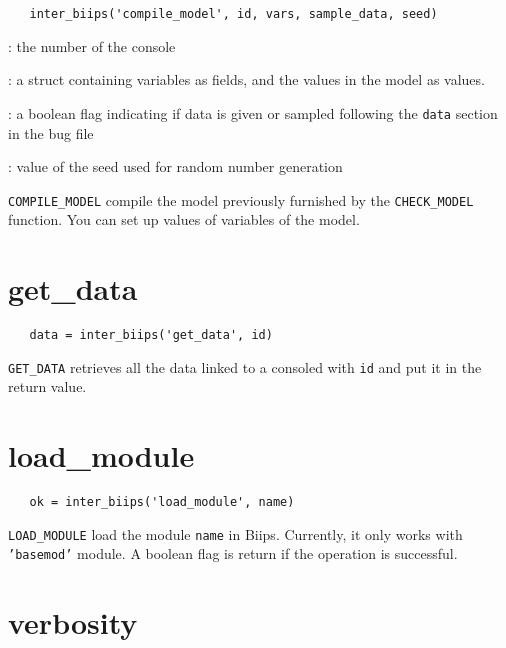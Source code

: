 \documentclass[11pt]{article}
\begin{document}
 \begin{lstlisting}
   inter_biips('compile_model', id, vars, sample_data, seed) 
 \end{lstlisting}
   \begin{description}
   \setlength{\baselineskip}{0.1\baselineskip}
     \item[\texttt{id}]: the number of the console
     \item[\texttt{vars}]: a struct containing variables as fields, and the values in the model as values.
     \item[\texttt{sample\_data}]: a boolean flag indicating if data is given or sampled following the \texttt{data} section in the bug file
     \item[\texttt{seed}]: value of the seed used for random number generation
   
   \end{description}

   \texttt{COMPILE\_MODEL} compile the model previously furnished by the \texttt{CHECK\_MODEL} function. You can set up values of variables of 
   the model.


\section{get\_data}
   
 \begin{lstlisting}
   data = inter_biips('get_data', id) 
 \end{lstlisting}
 
  \texttt{GET\_DATA} retrieves all the data linked to a consoled with \texttt{id} and put it in the return value.


\section{load\_module}
 
 \begin{lstlisting}
   ok = inter_biips('load_module', name)
 \end{lstlisting}

  \texttt{LOAD\_MODULE} load the module \texttt{name} in Biips. Currently, it only works with \texttt{'basemod'} module. A 
  boolean flag is return if the operation is successful.

\section{verbosity}
 
\end{document}
